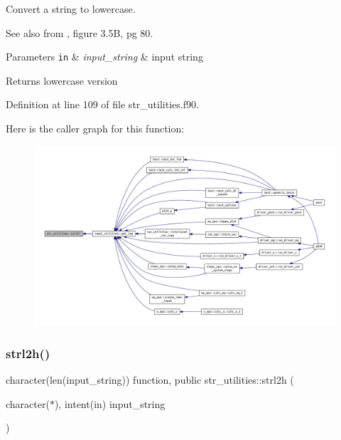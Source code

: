 Convert a string to lowercase. 

\begin{DoxySeeAlso}{See also}
from \cite{RedwineF90}, figure 3.\+5B, pg 80.
\end{DoxySeeAlso}

\begin{DoxyParams}[1]{Parameters}
\mbox{\tt in}  & {\em input\+\_\+string} & input string\\
\hline
\end{DoxyParams}
\begin{DoxyReturn}{Returns}
lowercase version 
\end{DoxyReturn}


Definition at line 109 of file str\+\_\+utilities.\+f90.

Here is the caller graph for this function\+:
\nopagebreak
\begin{figure}[H]
\begin{center}
\leavevmode
\includegraphics[width=350pt]{namespacestr__utilities_a219964a283968cc6a968db0197d2187e_icgraph}
\end{center}
\end{figure}
\mbox{\label{namespacestr__utilities_a7e2e441d509c12045a3373819040a806}} 
\subsubsection{\texorpdfstring{strl2h()}{strl2h()}}
{\footnotesize\ttfamily character(len(input\+\_\+string)) function, public str\+\_\+utilities\+::strl2h (\begin{DoxyParamCaption}\item[{character($\ast$), intent(in)}]{input\+\_\+string }\end{DoxyParamCaption})}




